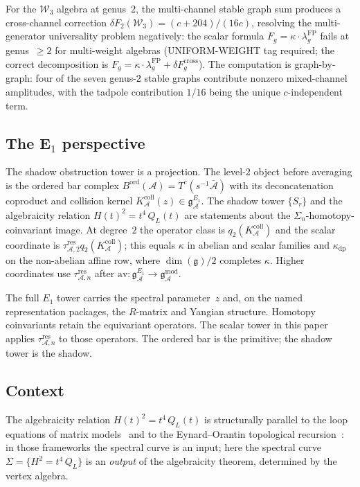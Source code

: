 \documentclass[11pt,reqno]{amsart}
\theoremstyle{definition}
\theoremstyle{remark}
\newcommand{\cA}{\mathcal{A}}
\newcommand{\cW}{\mathcal{W}}
\newcommand{\fg}{\mathfrak{g}}
\numberwithin{equation}{section}
\begin{document}
For the $\cW_3$ algebra at genus~$2$, the multi-channel
stable graph sum produces a cross-channel correction
$\delta F_2(\cW_3) = (c + 204)/(16c)$, resolving the
multi-generator universality problem negatively: the scalar
formula $F_g = \kappa \cdot \lambda_g^{\mathrm{FP}}$ fails
at genus~$\ge 2$ for multi-weight algebras (UNIFORM-WEIGHT
tag required; the correct decomposition is
$F_g = \kappa \cdot \lambda_g^{\mathrm{FP}} +
\delta F_g^{\mathrm{cross}}$). The computation is
graph-by-graph: four of the seven genus-$2$ stable graphs
contribute nonzero mixed-channel amplitudes, with the
tadpole contribution $1/16$ being the unique
$c$-independent term.

\subsection{The E$_1$ perspective}\label{subsec:intro-e1}

The shadow obstruction tower is a projection.
The level-$2$ object before averaging is the ordered bar complex
$B^{\mathrm{ord}}(\cA) = T^c(s^{-1}\bar{\cA})$ with its
deconcatenation coproduct and collision kernel
$K_\cA^{\mathrm{coll}}(z)\in\mathfrak{g}^{E_1}_\cA$. The shadow tower
$\{S_r\}$ and the algebraicity relation
$H(t)^2 = t^4\, Q_L(t)$ are statements about the
$\Sigma_n$-homotopy-coinvariant image.  At degree~$2$ the operator
class is $q_2(K_\cA^{\mathrm{coll}})$ and the scalar coordinate is
$\tau_{\cA,2}^{\mathrm{res}}q_2(K_\cA^{\mathrm{coll}})$; this equals
$\kappa$ in abelian and scalar families and $\kappa_{\mathrm{dp}}$
on the non-abelian affine row, where $\dim(\fg)/2$ completes
$\kappa$. Higher coordinates use $\tau_{\cA,n}^{\mathrm{res}}$ after
$\mathrm{av}\colon \mathfrak{g}^{E_1}_\cA \to
\mathfrak{g}^{\mathrm{mod}}_\cA$.

The full $E_1$ tower carries the spectral parameter~$z$ and, on the
named representation packages, the $R$-matrix and Yangian structure.
Homotopy coinvariants retain the equivariant operators. The scalar
tower in this paper applies $\tau_{\cA,n}^{\mathrm{res}}$ to those
operators. The ordered bar is the
primitive; the shadow tower is the shadow.

\subsection{Context}\label{subsec:intro-context}

The algebraicity relation $H(t)^2 = t^4\, Q_L(t)$ is
structurally parallel to the loop equations of matrix
models~\cite{ADKMV, DijkgraafVafa} and to the
Eynard--Orantin topological
recursion~\cite{EO}: in those
frameworks the spectral curve is an input; here the spectral
curve $\Sigma = \{H^2 = t^4\, Q_L\}$ is an \emph{output}
of the algebraicity theorem, determined by the
vertex algebra.
\end{document}
